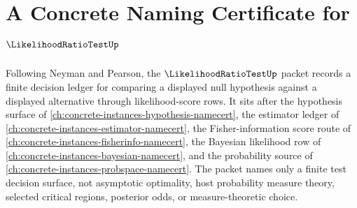 \chapter{A Concrete Naming Certificate for $\LikelihoodRatioTestUp$}
\label{ch:concrete-instances-likelihood-ratio-test-namecert}

Following Neyman and Pearson, the $\LikelihoodRatioTestUp$ packet records a finite decision ledger for comparing a displayed null hypothesis against a displayed alternative through likelihood-score rows. It sits after the hypothesis surface of \autoref{ch:concrete-instances-hypothesis-namecert}, the estimator ledger of \autoref{ch:concrete-instances-estimator-namecert}, the Fisher-information score route of \autoref{ch:concrete-instances-fisherinfo-namecert}, the Bayesian likelihood row of \autoref{ch:concrete-instances-bayesian-namecert}, and the probability source of \autoref{ch:concrete-instances-probspace-namecert}. The packet names only a finite test decision surface, not asymptotic optimality, host probability measure theory, selected critical regions, posterior odds, or measure-theoretic choice.

